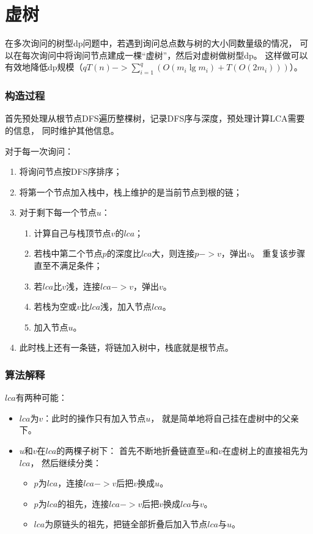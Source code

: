 \section{虚树}
在多次询问的树型dp问题中，若遇到询问总点数与树的大小同数量级的情况，
可以在每次询问中将询问节点建成一棵``虚树''，然后对虚树做树型dp。
这样做可以有效地降低dp规模（$\displaystyle qT(n)->
\sum_{i=1}^q{\left(O(m_i\lg m_i)+T(O(2m_i))\right)}$）。

\subsubsection{构造过程}

首先预处理从根节点DFS遍历整棵树，记录DFS序与深度，预处理计算LCA需要的信息，
同时维护其他信息。

对于每一次询问：
\begin{enumerate}
    \item 将询问节点按DFS序排序；
    \item 将第一个节点加入栈中，栈上维护的是当前节点到根的链；
    \item 对于剩下每一个节点$u$：
    \begin{enumerate}
        \item 计算自己与栈顶节点$v$的$lca$；
        \item 若栈中第二个节点$p$的深度比$lca$大，则连接$p->v$，弹出$v$。
        重复该步骤直至不满足条件；
        \item 若$lca$比$v$浅，连接$lca->v$，弹出$v$。
        \item 若栈为空或$v$比$lca$浅，加入节点$lca$。
        \item 加入节点$u$。
    \end{enumerate}
    \item 此时栈上还有一条链，将链加入树中，栈底就是根节点。
\end{enumerate}
\subsubsection{算法解释}

$lca$有两种可能：
\begin{itemize}
    \item $lca$为$v$：此时的操作只有加入节点$u$，
    就是简单地将自己挂在虚树中的父亲下。
    \item $u$和$v$在$lca$的两棵子树下：
    首先不断地折叠链直至$u$和$v$在虚树上的直接祖先为$lca$，
    然后继续分类：
    \begin{itemize}
        \item $p$为$lca$，连接$lca->v$后把$v$换成$u$。
        \item $p$为$lca$的祖先，连接$lca->v$后把$v$换成$lca$与$v$。
        \item $lca$为原链头的祖先，把链全部折叠后加入节点$lca$与$u$。
    \end{itemize}
\end{itemize}

